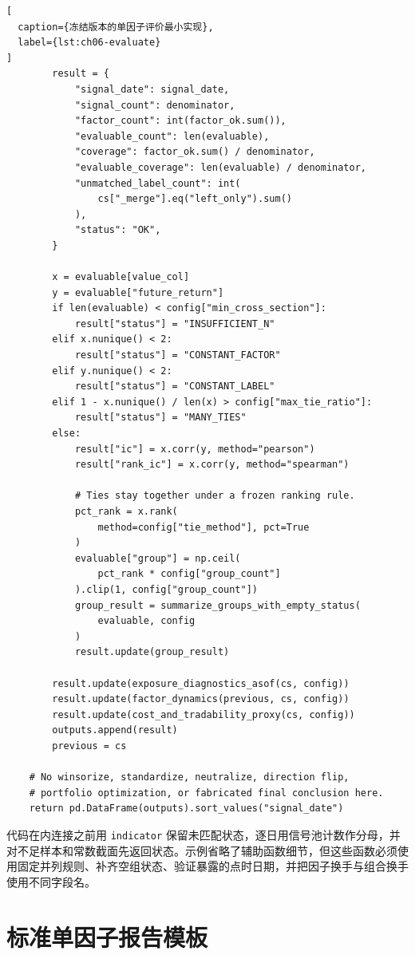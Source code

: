 \begin{lstlisting}[
  caption={冻结版本的单因子评价最小实现},
  label={lst:ch06-evaluate}
]
        result = {
            "signal_date": signal_date,
            "signal_count": denominator,
            "factor_count": int(factor_ok.sum()),
            "evaluable_count": len(evaluable),
            "coverage": factor_ok.sum() / denominator,
            "evaluable_coverage": len(evaluable) / denominator,
            "unmatched_label_count": int(
                cs["_merge"].eq("left_only").sum()
            ),
            "status": "OK",
        }

        x = evaluable[value_col]
        y = evaluable["future_return"]
        if len(evaluable) < config["min_cross_section"]:
            result["status"] = "INSUFFICIENT_N"
        elif x.nunique() < 2:
            result["status"] = "CONSTANT_FACTOR"
        elif y.nunique() < 2:
            result["status"] = "CONSTANT_LABEL"
        elif 1 - x.nunique() / len(x) > config["max_tie_ratio"]:
            result["status"] = "MANY_TIES"
        else:
            result["ic"] = x.corr(y, method="pearson")
            result["rank_ic"] = x.corr(y, method="spearman")

            # Ties stay together under a frozen ranking rule.
            pct_rank = x.rank(
                method=config["tie_method"], pct=True
            )
            evaluable["group"] = np.ceil(
                pct_rank * config["group_count"]
            ).clip(1, config["group_count"])
            group_result = summarize_groups_with_empty_status(
                evaluable, config
            )
            result.update(group_result)

        result.update(exposure_diagnostics_asof(cs, config))
        result.update(factor_dynamics(previous, cs, config))
        result.update(cost_and_tradability_proxy(cs, config))
        outputs.append(result)
        previous = cs

    # No winsorize, standardize, neutralize, direction flip,
    # portfolio optimization, or fabricated final conclusion here.
    return pd.DataFrame(outputs).sort_values("signal_date")
\end{lstlisting}

代码在内连接之前用 \texttt{indicator} 保留未匹配状态，逐日用信号池计数作分母，并对不足样本和常数截面先返回状态。示例省略了辅助函数细节，但这些函数必须使用固定并列规则、补齐空组状态、验证暴露的点时日期，并把因子换手与组合换手使用不同字段名。

\section{标准单因子报告模板}

